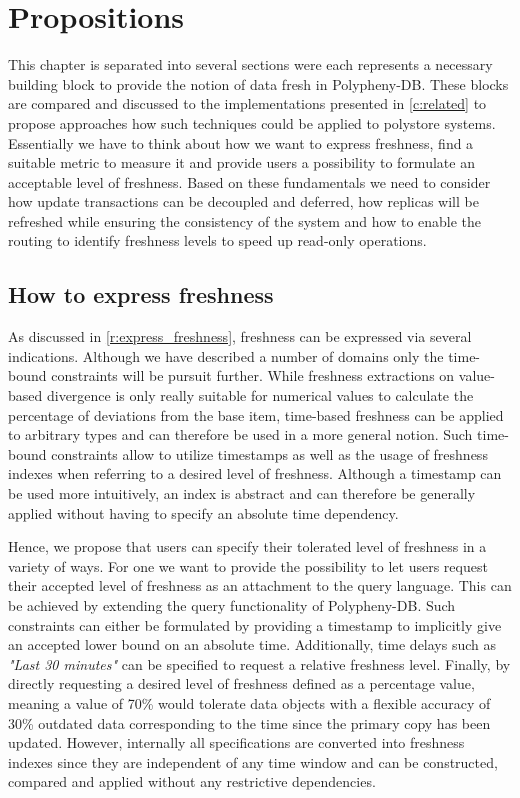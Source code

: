 \chapter{Propositions}
\label{c:propositions}

This chapter is separated into several sections were each represents a necessary building block to provide the notion of data fresh in Polypheny-DB.
These blocks are compared and discussed to the implementations presented in \ref{c:related} to propose approaches how such techniques could be applied to polystore
systems. Essentially we have to think about how we want to express freshness, find a suitable metric to measure it and provide users a possibility to formulate 
an acceptable level of freshness. Based on these fundamentals we need to consider how update transactions can be decoupled and deferred, how replicas will
be refreshed while ensuring the consistency of the system and how to enable the routing to identify freshness levels to speed up read-only operations. 



\section{ How to express freshness}
\label{express}

As discussed in \ref{r:express_freshness}, freshness can be expressed via several indications.
Although we have described a number of domains only the time-bound constraints will be pursuit further. 
While freshness extractions on value-based divergence is only really suitable for numerical values
to calculate the percentage of deviations from the base item, time-based freshness can be applied to arbitrary types and can therefore be used 
in a more general notion. 
Such time-bound constraints allow to utilize timestamps as well as the usage of freshness indexes when referring to a desired level of freshness. 
Although a timestamp can be used more intuitively, an index is abstract and can therefore be generally applied without having to specify an absolute time dependency.

Hence, we propose that users can specify their tolerated level of freshness in a variety of ways. For one we want to provide the possibility to let users 
request their accepted level of freshness as an attachment to the query language. This can be achieved by extending the query functionality of Polypheny-DB.
Such constraints can either be formulated by providing a timestamp to implicitly give an accepted lower bound on an absolute time.
Additionally, time delays such as \textit{"Last 30 minutes"} can be specified to request a relative freshness level.
Finally, by directly requesting a desired level of freshness defined as a percentage value, meaning a value of 70\% would tolerate data objects
with a flexible accuracy of 30\% outdated data corresponding to the time since the primary copy has been updated.
However, internally all specifications are converted into freshness indexes since they are independent of any time window and can be constructed, compared and applied 
without any restrictive dependencies.\\

